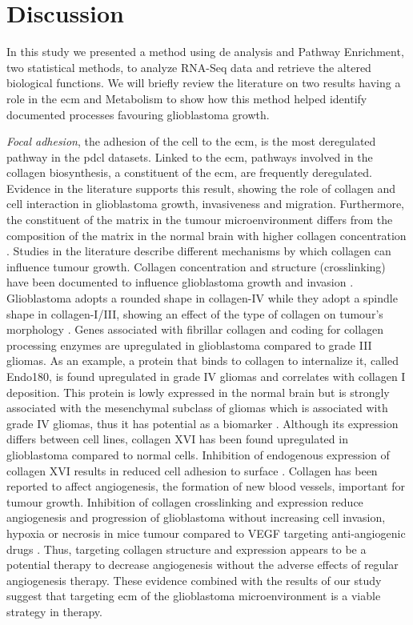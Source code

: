 \section{Discussion}

In this study we presented a method using \acrlong{de} analysis and Pathway Enrichment, two statistical methods, to analyze RNA-Seq data and retrieve the altered biological functions.
We will briefly review the literature on two results having a role in the \acrshort{ecm} and Metabolism to show how this method helped identify documented processes favouring glioblastoma growth.

\textit{Focal adhesion}, the adhesion of the cell to the \acrshort{ecm}, is the most deregulated pathway in the \acrshort{pdcl} datasets.
Linked to the \acrlong{ecm}, pathways involved in the collagen biosynthesis, a constituent of the \acrshort{ecm}, are frequently deregulated.
Evidence in the literature supports this result, showing the role of collagen and cell interaction in glioblastoma growth, invasiveness and migration.
Furthermore, the constituent of the matrix in the tumour microenvironment differs from the composition of the matrix in the normal brain with higher collagen concentration \cite*{Mammoto2013}.
Studies in the literature describe different mechanisms by which collagen can influence tumour growth.
Collagen concentration and structure (crosslinking) have been documented to influence glioblastoma growth and invasion \cite*{Kaphle2019,Kaufman2005,Rao2013}. 
Glioblastoma adopts a rounded shape in collagen-IV while they adopt a spindle shape in collagen-I/III, showing an effect of the type of collagen on tumour's morphology \cite*{Rao2013}.
Genes associated with fibrillar collagen and coding for collagen processing enzymes are upregulated in glioblastoma compared to grade III gliomas.
As an example, a protein that binds to collagen to internalize it, called Endo180, is found upregulated in grade IV gliomas and correlates with collagen I deposition. 
This protein is lowly expressed in the normal brain but is strongly associated with the mesenchymal subclass of gliomas which is associated with grade IV gliomas, thus it has potential as a biomarker \cite*{Huijbers2010}.
Although its expression differs between cell lines, collagen XVI has been found upregulated in glioblastoma compared to normal cells.
Inhibition of endogenous expression of collagen XVI results in reduced cell adhesion to surface \cite*{Senner2008}.
Collagen has been reported to affect angiogenesis, the formation of new blood vessels, important for tumour growth.
Inhibition of collagen crosslinking and expression reduce angiogenesis and progression of glioblastoma without increasing cell invasion, hypoxia or necrosis in mice tumour compared to VEGF targeting anti-angiogenic drugs \cite*{Mammoto2013}.
Thus, targeting collagen structure and expression appears to be a potential therapy to decrease angiogenesis without the adverse effects of regular angiogenesis therapy.
These evidence combined with the results of our study suggest that targeting \acrshort{ecm} of the glioblastoma microenvironment is a viable strategy in therapy.

